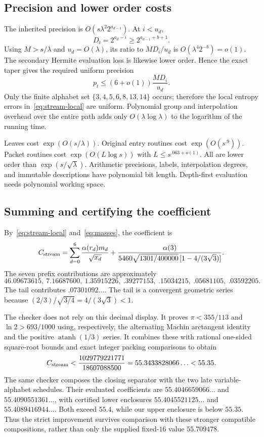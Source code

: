\documentclass[11pt,letterpaper]{article}
\theoremstyle{remark}\newtheorem{remark}[theorem]{Remark}
\begin{document}
\subsection{Precision and lower order costs}
The inherited precision is $O(s\lambda^2 2^{a_{d-1}})$. At $i<u_d$,
\[
 D_i=2^{a_d-i}\ge2^{a_{d-1}+b+1}.
\]
Using $M>s/\lambda$ and $u_d=O(\lambda)$, its ratio to $MD_i/u_d$ is $O(\lambda^4 2^{-b})=o(1)$. The secondary Hermite evaluation loss is likewise lower order. Hence the exact taper gives the required uniform precision
\[
 p_t\le(6+o(1))\frac{MD_i}{u_d}.
\]
Only the finite alphabet set $\{3,4,5,6,8,13,14\}$ occurs; therefore the local entropy errors in~\eqref{eq:stream-local} are uniform. Polynomial group and interpolation overhead over the entire path adds only $O(\lambda\log\lambda)$ to the logarithm of the running time.

Leaves cost $\exp(O(s/\lambda))$. Original entry routines cost $\exp(O(s^{.9}))$. Packet routines cost $\exp(O(L\log s))$ with $L\le s^{.063+o(1)}$. All are lower order than $\exp(s/\sqrt\lambda)$. Arithmetic precisions, labels, interpolation degrees, and immutable descriptions have polynomial bit length. Depth-first evaluation needs polynomial working space.

\subsection{Summing and certifying the coefficient}
By~\eqref{eq:stream-local} and~\eqref{eq:masses}, the coefficient is
\begin{equation}\label{eq:cadapt}
 C_{\rm stream}=\sum_{d=0}^6\frac{\alpha(r_d)m_d}{\sqrt{x_d}}
 +\frac{\alpha(3)}{5460\sqrt{1301/400000}\,[1-4/(3\sqrt3)]}.
\end{equation}
The seven prefix contributions are approximately
\[
46.09673615,\ 7.16687600,\ 1.35915226,\ .39277153,\ .15034215,\ .05681105,\ .03592205.
\]
The tail contributes $.07301092\ldots$. The tail is a convergent geometric series because $(2/3)/\sqrt{3/4}=4/(3\sqrt3)<1$.

The checker does not rely on this decimal display. It proves $\pi<355/113$ and $\ln2>693/1000$ using, respectively, the alternating Machin arctangent identity and the positive $\operatorname{atanh}(1/3)$ series. It combines these with rational one-sided square-root bounds and exact integer packing comparisons to obtain
\begin{equation}\label{eq:exact64}
 C_{\rm stream}<\frac{1029779221771}{18607088500}
 =55.3433828066\ldots<55.35.
\end{equation}
The same checker composes the closing separator with the two late variable-alphabet schedules. Their evaluated coefficients are $55.4046659066\ldots$ and $55.4090551361\ldots$, with certified lower enclosures $55.4045521125\ldots$ and $55.4089416944\ldots$. Both exceed $55.4$, while our upper enclosure is below $55.35$. Thus the strict improvement survives comparison with these stronger compatible compositions, rather than only the supplied fixed-$16$ value $55.709478$.
\end{document}
